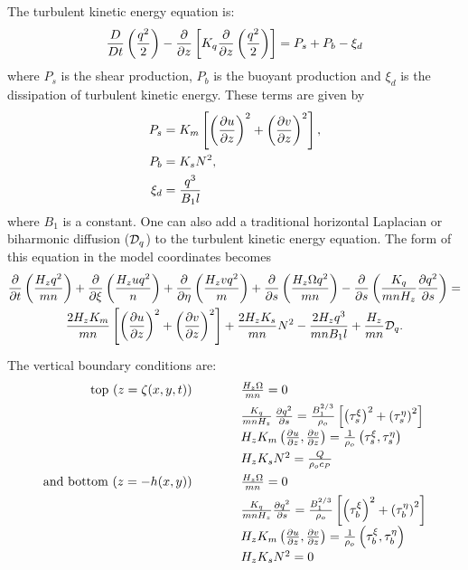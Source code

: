 The turbulent kinetic energy equation is:
\begin{equation}
  {D \over Dt} \left( {q^2 \over 2} \right) -
  {\partial \over \partial z} \left[ K_q {\partial \over \partial z} 
  \left( {q^2 \over 2} \right) \right] = P_s + P_b - \xi_d
\end{equation}
where $P_s$ is the shear production, $P_b$ is the buoyant production
and $\xi_d$ is the dissipation of turbulent kinetic energy. 
These terms are given by
\begin{align}
   P_s &= K_m \left[ \left( {\partial u \over \partial z }\right)^2 +
   \left( {\partial v \over \partial z} \right)^2 \right],  \\
   P_b &= K_s N^2, \\
   \xi_d &= {q^3 \over B_1 l}
\end{align}
where $B_1$ is a constant.
One can also add a traditional horizontal Laplacian or biharmonic
diffusion (${\cal D}_q$) to the turbulent kinetic energy equation.
The form of this equation in the model coordinates becomes
\begin{multline}
  {\partial \over \partial t} \left( {H_z q^2 \over mn} \right) +
  {\partial \over \partial \xi} \left( {H_z u q^2 \over n} \right) +
  {\partial \over \partial \eta} \left( {H_z v q^2 \over m} \right) +
  {\partial \over \partial s} \left( {H_z \Omega q^2 \over mn} \right) -
  {\partial \over \partial s} \left( {K_q \over mnH_z}
  {\partial q^2 \over \partial s} \right) =
\\ \vspace{1mm}
  {2H_z K_m \over mn} \left[ \left({\partial u \over \partial z}
  \right)^2 + \left( {\partial v \over \partial z} \right)^2 \right] +
  {2H_z K_s \over mn} N^2 - {2H_z q^3 \over mnB_1 l} +
  {H_z \over mn} {\cal D}_q .
\end{multline}
The vertical boundary conditions are:
\[
\begin{array}{rl}
  \mbox{top ($z = \zeta(x,y,t))$} \hspace{1cm}
  & {H_z \Omega \over mn} = 0 \\ [1.5mm]
  & {K_q \over mn H_z} \, \frac{\partial q^2}{\partial s}
    = {B_1^{2/3} \over \rho_o} \left[ \left( \tau_s^\xi \right)^2
    + \left( \tau_s^\eta \right)^2  \right] \\ [1.5mm]
  & H_z K_m \left( {\partial u \over \partial z},
    {\partial v \over \partial z} \right) = {1 \over \rho_o}
    \left( \tau_s^\xi, \tau_s^\eta \right) \\ [1.5mm]
  & H_z K_s N^2 = {Q \over \rho_o c_P} \\[2mm]
  \mbox{and bottom ($z = -h(x,y)$)} \hspace{1cm} &
    {H_z \Omega \over mn} = 0 \\[1.5mm]
  & {K_q \over mnH_z} {\partial q^2 \over \partial s}
    = {B_1^{2/3} \over \rho_o} \left[ \left( \tau_b^\xi \right)^2
    + \left( \tau_b^\eta \right)^2  \right] \\ [1.5mm]
  & H_z K_m \left( {\partial u \over \partial z},
    {\partial v \over \partial z} \right) = {1 \over \rho_o}
    \left( \tau_b^\xi, \tau_b^\eta \right) \\ [1.5mm]
  & H_z K_s N^2 = 0
\end{array}
\]
